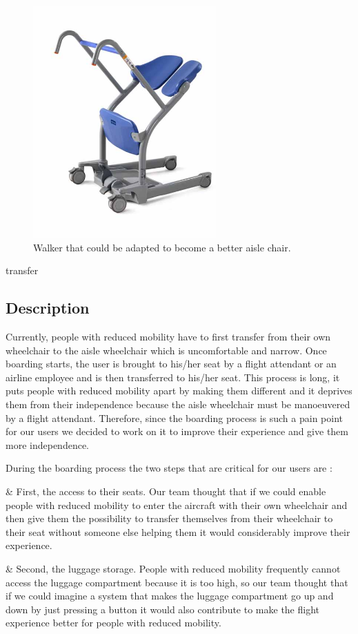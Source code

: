 \begin{figure}[h]
  \centering
     \includegraphics[width=7cm]{images/walker.jpg}
   \caption{Walker that could be adapted to become a better aisle chair.}%
  \label{fig:walker.jpg}
\end{figure} 
transfer

\subsection{Description}
Currently, people with reduced mobility have to first transfer from their own wheelchair to the aisle wheelchair which is uncomfortable and narrow. Once boarding starts, the user is brought to his/her seat by a flight attendant or an airline employee and is then transferred to his/her seat. This process is long, it puts people with reduced mobility apart by making them different and it deprives them from their independence because the aisle wheelchair must be manoeuvered by a flight attendant. Therefore, since the boarding process is such a pain point for our users we decided to work on it to improve their experience and give them more independence.

During the boarding process the two steps that are critical for our users are :

 \begin{easylist}[itemize]

& First, the access to their seats. Our team thought that if we could enable people with reduced mobility to enter the aircraft with their own wheelchair and then give them the possibility to transfer themselves from their wheelchair to their seat without someone else helping them it would considerably improve their experience.

& Second, the luggage storage. People with reduced mobility frequently cannot access the luggage compartment because it is too high, so our team thought that if we could imagine a system that makes the luggage compartment go up and down by just pressing a button it would also contribute to make the flight experience better for people with reduced mobility.

\end{easylist}

